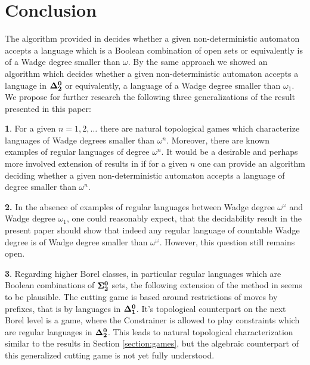
\section{Conclusion}
The algorithm provided in \cite{bp} decides whether a given non-deterministic automaton  accepts a language which is a Boolean combination of open sets or equivalently is of a  Wadge degree smaller than $\omega$. 
By the same approach we showed an algorithm which decides whether a given non-deterministic automaton accepts a language in ${\bf \Delta^0_2}$ or equivalently, a language of a Wadge degree smaller than $\omega_1$. 
We propose for further research the following three generalizations of the result presented in this paper:

\noindent
{\bf 1}. %
For a given $n=1,2,\dots$ there are natural topological games which characterize languages of Wadge degrees smaller than $\omega^n$. Moreover, there are known examples of regular languages of  degree $\omega^n$. It would be a desirable and perhaps more involved extension of results in \cite{bp} if for a given $n$ one can provide an algorithm deciding whether a given non-deterministic automaton accepts a language of degree smaller than $\omega^n$. 

\noindent
{\bf 2.} In the absence of examples of regular languages between Wadge degree $\omega^\omega$ and Wadge degree $\omega_1$, one could reasonably expect, that the decidability result in the present paper should show that indeed any regular language of countable Wadge degree is of Wadge degree smaller than $\omega^\omega$. However, this question still remains open.  

\noindent
{\bf 3}. Regarding higher Borel classes, in particular regular languages which are Boolean combinations of ${\bf \Sigma^0_2}$ sets, the following extension of the method in \cite{bp} seems to be plausible. The cutting game is based around restrictions of moves by prefixes, that is 
by languages in ${\bf \Delta^0_1}$. It's  topological counterpart on the next Borel level is a game, where the Constrainer is allowed to play constraints which are regular languages in ${\bf \Delta^0_2}$. This leads to natural topological characterization similar to the results in Section \ref{section:games}, but the algebraic counterpart of this generalized cutting game is not yet fully understood.

